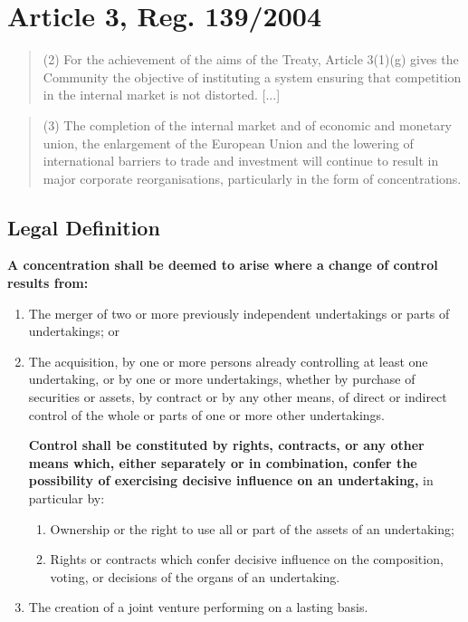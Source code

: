 \section{Article 3, Reg. 139/2004}
    
    \begin{quote}
        (2) For the achievement of the aims of the Treaty, Article 3(1)(g) gives the Community the objective of instituting a system ensuring that competition in the internal market is not distorted. [...]
    \end{quote}

    \begin{quote}
        (3) The completion of the internal market and of economic and monetary union, the enlargement of the European Union and the lowering of international barriers to trade and investment will continue to result in major corporate reorganisations, particularly in the form of concentrations.
    \end{quote}

\newpage

    \subsection{Legal Definition}

        \textbf{A concentration shall be deemed to arise where a change of control results from:}
        \begin{enumerate}
            \item The merger of two or more previously independent undertakings or parts of undertakings; or
            \item The acquisition, by one or more persons already controlling at least one undertaking, or by one or more undertakings, whether by purchase of securities or assets, by contract or by any other means, of direct or indirect control of the whole or parts of one or more other undertakings.
        
                \textbf{Control shall be constituted by rights, contracts, or any other means which, either separately or in combination, confer the possibility of exercising decisive influence on an undertaking,} in particular by:
                \begin{enumerate}[label=\roman*.]
                    \item Ownership or the right to use all or part of the assets of an undertaking;
                    \item Rights or contracts which confer decisive influence on the composition, voting, or decisions of the organs of an undertaking.
                \end{enumerate}
            \item The creation of a joint venture performing on a lasting basis.
        \end{enumerate}

